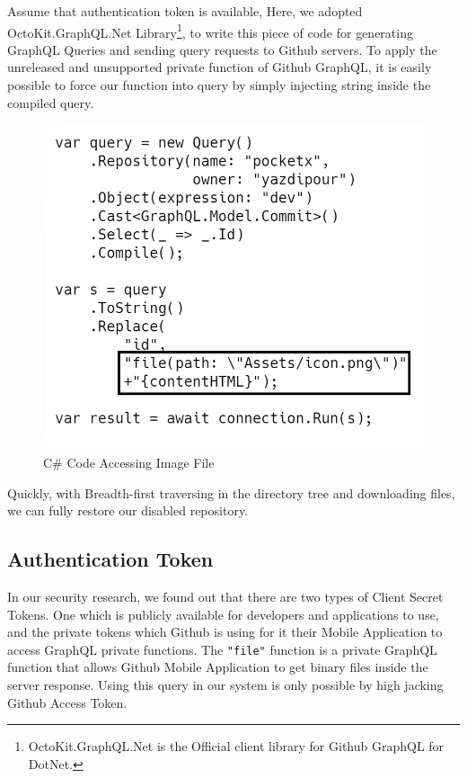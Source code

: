 \documentclass[conference]{IEEEtran}
\begin{document}
Assume that authentication token is available, Here, we adopted OctoKit.GraphQL.Net Library\footnote{OctoKit.GraphQL.Net is the Official client library for Github GraphQL for DotNet.}, to write this piece of code for generating GraphQL Queries and sending query requests to Github servers. To apply the unreleased and unsupported private function of Github GraphQL, it is easily possible to force our function into query by simply injecting string inside the compiled query.

\begin{figure}[hbt!]
  \includegraphics[width=\linewidth]{carbon3.png}
  \caption{C\# Code Accessing Image File}
  \label{fig:carbon3}
\end{figure}

Quickly, with Breadth-first traversing in the directory tree and downloading files, we can fully restore our disabled repository.

\subsection{Authentication Token}

In our security research, we found out that there are two types of Client Secret Tokens. One which is publicly available for developers and applications to use, and the private tokens which Github is using for it their Mobile Application to access GraphQL private functions.
The \verb|"file"| function is a private GraphQL function that allows Github Mobile Application to get binary files inside the server response. Using this query in our system is only possible by high jacking Github Access Token.
\end{document}
